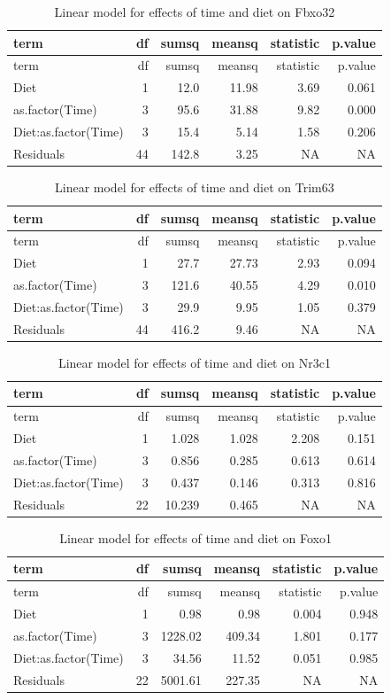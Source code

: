 \documentclass[]{article}
\begin{document}
\begin{longtable}[]{@{}lrrrrr@{}}
\caption{Linear model for effects of time and diet on
Fbxo32}\tabularnewline
\toprule
term & df & sumsq & meansq & statistic & p.value\tabularnewline
\midrule
\endfirsthead
\toprule
term & df & sumsq & meansq & statistic & p.value\tabularnewline
\midrule
\endhead
Diet & 1 & 12.0 & 11.98 & 3.69 & 0.061\tabularnewline
as.factor(Time) & 3 & 95.6 & 31.88 & 9.82 & 0.000\tabularnewline
Diet:as.factor(Time) & 3 & 15.4 & 5.14 & 1.58 & 0.206\tabularnewline
Residuals & 44 & 142.8 & 3.25 & NA & NA\tabularnewline
\bottomrule
\end{longtable}

\begin{longtable}[]{@{}lrrrrr@{}}
\caption{Linear model for effects of time and diet on
Trim63}\tabularnewline
\toprule
term & df & sumsq & meansq & statistic & p.value\tabularnewline
\midrule
\endfirsthead
\toprule
term & df & sumsq & meansq & statistic & p.value\tabularnewline
\midrule
\endhead
Diet & 1 & 27.7 & 27.73 & 2.93 & 0.094\tabularnewline
as.factor(Time) & 3 & 121.6 & 40.55 & 4.29 & 0.010\tabularnewline
Diet:as.factor(Time) & 3 & 29.9 & 9.95 & 1.05 & 0.379\tabularnewline
Residuals & 44 & 416.2 & 9.46 & NA & NA\tabularnewline
\bottomrule
\end{longtable}

\begin{longtable}[]{@{}lrrrrr@{}}
\caption{Linear model for effects of time and diet on
Nr3c1}\tabularnewline
\toprule
term & df & sumsq & meansq & statistic & p.value\tabularnewline
\midrule
\endfirsthead
\toprule
term & df & sumsq & meansq & statistic & p.value\tabularnewline
\midrule
\endhead
Diet & 1 & 1.028 & 1.028 & 2.208 & 0.151\tabularnewline
as.factor(Time) & 3 & 0.856 & 0.285 & 0.613 & 0.614\tabularnewline
Diet:as.factor(Time) & 3 & 0.437 & 0.146 & 0.313 & 0.816\tabularnewline
Residuals & 22 & 10.239 & 0.465 & NA & NA\tabularnewline
\bottomrule
\end{longtable}

\begin{longtable}[]{@{}lrrrrr@{}}
\caption{Linear model for effects of time and diet on
Foxo1}\tabularnewline
\toprule
term & df & sumsq & meansq & statistic & p.value\tabularnewline
\midrule
\endfirsthead
\toprule
term & df & sumsq & meansq & statistic & p.value\tabularnewline
\midrule
\endhead
Diet & 1 & 0.98 & 0.98 & 0.004 & 0.948\tabularnewline
as.factor(Time) & 3 & 1228.02 & 409.34 & 1.801 & 0.177\tabularnewline
Diet:as.factor(Time) & 3 & 34.56 & 11.52 & 0.051 & 0.985\tabularnewline
Residuals & 22 & 5001.61 & 227.35 & NA & NA\tabularnewline
\bottomrule
\end{longtable}
\end{document}
